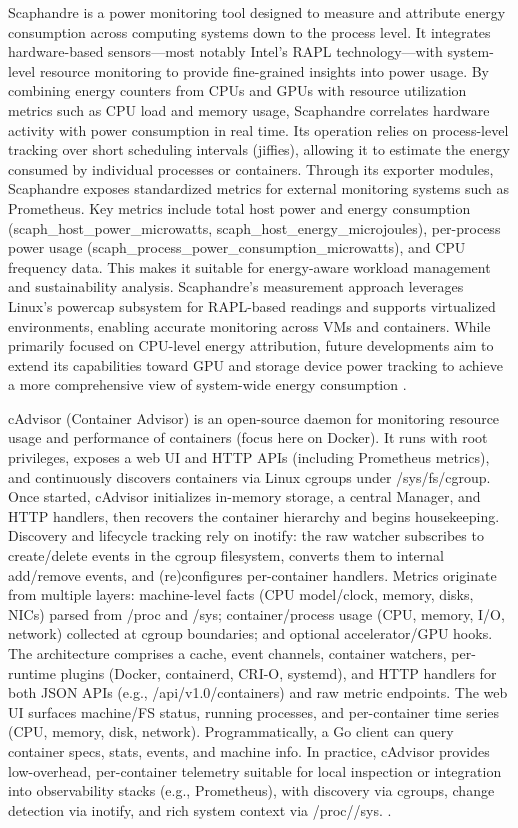 Scaphandre is a power monitoring tool designed to measure and attribute energy consumption across computing systems down to the process level. It integrates hardware-based sensors—most notably Intel’s RAPL technology—with system-level resource monitoring to provide fine-grained insights into power usage. By combining energy counters from CPUs and GPUs with resource utilization metrics such as CPU load and memory usage, Scaphandre correlates hardware activity with power consumption in real time. Its operation relies on process-level tracking over short scheduling intervals (jiffies), allowing it to estimate the energy consumed by individual processes or containers.
Through its exporter modules, Scaphandre exposes standardized metrics for external monitoring systems such as Prometheus. Key metrics include total host power and energy consumption (scaph_host_power_microwatts, scaph_host_energy_microjoules), per-process power usage (scaph_process_power_consumption_microwatts), and CPU frequency data. This makes it suitable for energy-aware workload management and sustainability analysis. Scaphandre’s measurement approach leverages Linux’s powercap subsystem for RAPL-based readings and supports virtualized environments, enabling accurate monitoring across VMs and containers. While primarily focused on CPU-level energy attribution, future developments aim to extend its capabilities toward GPU and storage device power tracking to achieve a more comprehensive view of system-wide energy consumption \cite{CENTOFANTI2024110371}.

cAdvisor (Container Advisor) is an open-source daemon for monitoring resource usage and performance of containers (focus here on Docker). It runs with root privileges, exposes a web UI and HTTP APIs (including Prometheus metrics), and continuously discovers containers via Linux cgroups under /sys/fs/cgroup. Once started, cAdvisor initializes in-memory storage, a central Manager, and HTTP handlers, then recovers the container hierarchy and begins housekeeping. Discovery and lifecycle tracking rely on inotify: the raw watcher subscribes to create/delete events in the cgroup filesystem, converts them to internal add/remove events, and (re)configures per-container handlers. Metrics originate from multiple layers: machine-level facts (CPU model/clock, memory, disks, NICs) parsed from /proc and /sys; container/process usage (CPU, memory, I/O, network) collected at cgroup boundaries; and optional accelerator/GPU hooks. The architecture comprises a cache, event channels, container watchers, per-runtime plugins (Docker, containerd, CRI-O, systemd), and HTTP handlers for both JSON APIs (e.g., /api/v1.0/containers) and raw metric endpoints. The web UI surfaces machine/FS status, running processes, and per-container time series (CPU, memory, disk, network). Programmatically, a Go client can query container specs, stats, events, and machine info. In practice, cAdvisor provides low-overhead, per-container telemetry suitable for local inspection or integration into observability stacks (e.g., Prometheus), with discovery via cgroups, change detection via inotify, and rich system context via /proc//sys. \cite{Tolaram2023}.


